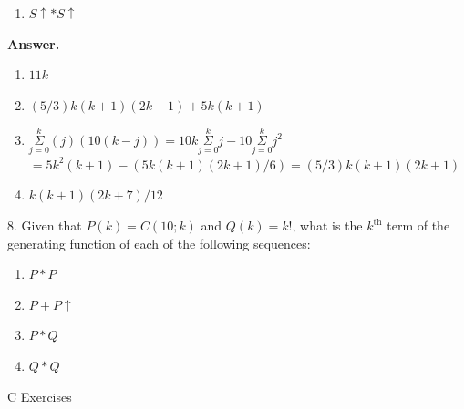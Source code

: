 \documentclass[10pt,]{book}
\theoremstyle{plain}
\theoremstyle{definition}
\theoremstyle{definition}
\theoremstyle{definition}
\theoremstyle{definition}
\numberwithin{equation}{section}
\begin{document}
\begin{exercisegroup}
\begin{enumerate}[label=\alph*]
\item\hypertarget{li-196}{} \(S\uparrow *S\uparrow\)%
\end{enumerate}
%
\par\smallskip
\par\smallskip
\noindent\textbf{Answer.}\hypertarget{answer-22}{}\quad
\leavevmode%
\begin{enumerate}[label=\alph*]
\item\hypertarget{li-197}{} \(11k\)%
\item\hypertarget{li-198}{} \((5/3)k(k+1)(2k+1)+5k(k+1)\)%
\item\hypertarget{li-199}{} \(\underset{j=0}{\overset{k}{\Sigma }}(j)(10(k-j))=10k\underset{j=0}{\overset{k}{\Sigma }}j-10\underset{j=0}{\overset{k}{\Sigma }}j^2\)
    \(=5k^2(k+1)-(5k(k+1)(2k+1)/6)
=(5/3)k(k+1)(2k+1)\)%
\item\hypertarget{li-200}{} \(k(k+1)(2k+7)/12\)%
\end{enumerate}
%
\item[8.]\hypertarget{exercise-44}{}Given that \(P(k) = C(10;k)\) and \(Q(k) = k!\), what is the \(k^{\text{th}}\) term of the generating function of each of the following sequences:%
\par
\leavevmode%
\begin{enumerate}[label=\alph*]
\item\hypertarget{li-201}{}\(P * P\)%
\item\hypertarget{li-202}{}\(P + P\uparrow\)%
\item\hypertarget{li-203}{}\(P * Q\)%
\item\hypertarget{li-204}{} \(Q * Q\)%
\end{enumerate}
%
\par\smallskip
\end{exercisegroup}
\par\smallskip\noindent
\hypertarget{exercisegroup-12}{}\typeout{************************************************}
\typeout{************************************************}
C Exercises%
\end{document}
